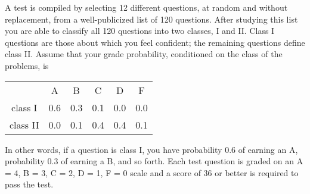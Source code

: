 \documentclass[11pt,addpoints,answers]{exam}
\begin{document}
\begin{questions}

\question A test is compiled by selecting 12 different questions, at random and
without replacement, from a well-publicized list of 120 questions. After
studying this list you are able to classify all 120 questions into two classes,
I and II. Class I questions are those about which you feel confident; the
remaining questions define class II. Assume that your grade probability,
conditioned on the class of the problems, is
\begin{center}
  \begin{tabular}{c  c  c  c  c  c}

    & A & B & C & D & F\\
    class I & 0.6 & 0.3 & 0.1 & 0.0 & 0.0\\
    class II & 0.0 & 0.1 & 0.4 & 0.4 & 0.1\\
  \end{tabular}
\end{center}
In other words, if a question is class I, you have probability 0.6 of earning
an A, probability 0.3 of earning a B, and so forth. Each test question is
graded on an A = 4, B = 3, C = 2, D = 1, F = 0 scale and a score of 36 or
better is required to pass the test. 

\end{questions}
\end{document}
